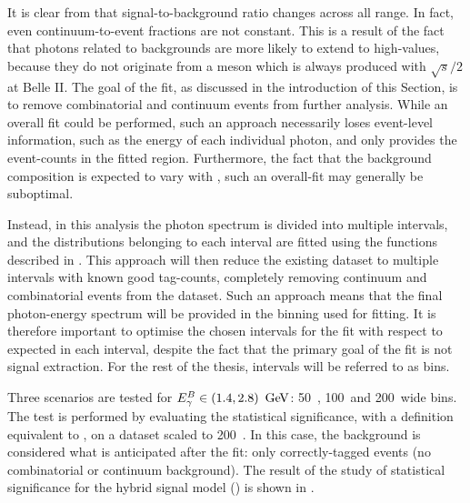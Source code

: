 It is clear from  that signal-to-background ratio changes across all \EB range.
In fact, even continuum-to-\BB event fractions are not constant.
This is a result of the fact that photons related to \epem\ra\qqbar backgrounds are more likely to extend to high-\EB values, because they do not originate from a \B meson which is always produced with $\sqrt{s}/2$ at Belle II.
The goal of the fit, as discussed in the introduction of this Section, is to remove combinatorial \BB and continuum events from further analysis.
While an overall \Mbc fit could be performed, such an approach necessarily loses event-level information, such as the energy of each individual photon, and only provides the event-counts in the fitted \EB region.
Furthermore, the fact that the background composition is expected to vary with \EB, such an overall-fit may generally be suboptimal.

Instead, in this analysis the photon spectrum is divided into multiple \EB intervals, and the \Mbc distributions belonging to each interval are fitted using the functions described in .
This approach will then reduce the existing dataset to multiple \EB intervals with known good tag-\B counts, completely removing continuum and combinatorial \BB events from the dataset.
Such an approach means that the final photon-energy spectrum will be provided in the binning used for fitting.
It is therefore important to optimise the chosen intervals for the fit with respect to expected \BtoXsgamma in each interval, despite the fact that the primary goal of the fit is not signal extraction.
For the rest of the thesis, \EB intervals will be referred to as \EB bins.

Three scenarios are tested for ${E^B_{\gamma}}\in(1.4,2.8)~\mathrm{\,Ge\kern -0.1em V}$: 50~\mev, 100~\mev and 200~\mev wide bins.
The test is performed by evaluating the statistical significance, with a definition equivalent to , on a dataset scaled to 200~\invfb.
In this case, the background is considered what is anticipated after the \Mbc fit: only correctly-tagged \BB events (no combinatorial or continuum background).
The result of the study of statistical significance for the hybrid signal model () is shown in .

